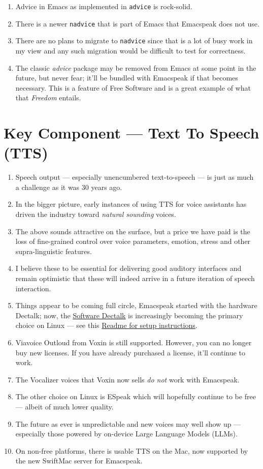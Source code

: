 \documentclass[11pt]{article}
\begin{document}
\begin{enumerate}
\item Advice in Emacs as implemented in \texttt{advice} is rock-solid.
\item There is a newer \texttt{nadvice} that is part of Emacs that Emacspeak
does not use.

\item There are no plans to migrate to \texttt{nadvice} since that is a lot of
busy work in my view and any such migration would be difficult
to test for correctness.
\item The classic \emph{advice} package may be removed from Emacs at some
point in the future, but never fear; it'll be bundled with
Emacspeak if that becomes necessary. This is a feature of Free Software and is a great
example of what that \emph{Freedom} entails.
\end{enumerate}
\section{Key Component —  Text To Speech (TTS)}
\label{sec:orgc35da78}

\begin{enumerate}
\item Speech output --- especially unencumbered text-to-speech --- is just
as much a challenge as it was 30 years ago.
\item In the bigger picture, early instances of using TTS for voice
assistants has driven the industry toward \emph{natural sounding} voices.
\item The above sounds attractive on the surface, but a price we have
paid is the  loss of fine-grained control over voice parameters,
emotion, stress and other supra-linguistic features.
\item I  believe  these to be essential for delivering
good auditory interfaces and   remain optimistic that
these will indeed arrive in a future iteration of speech
interaction.
\item Things appear to be coming full circle, Emacspeak started with
the hardware Dectalk; now, the \href{https://github.com/dectalk/dectalk.git}{Software Dectalk} is increasingly
becoming the primary choice on Linux --- see this  \href{https://raw.githubusercontent.com/tvraman/emacspeak/master/servers/software-dtk/Readme.org}{Readme for setup instructions}.
\item Viavoice Outloud from Voxin is still supported.  However,
you can no longer buy new licenses. If you have already purchased
a license, it'll
continue to work.
\item The  Vocalizer voices that Voxin now sells \emph{do not} work with Emacspeak.
\item The  other choice on Linux is ESpeak which will hopefully
continue to be free --- albeit of much lower quality.
\item The future as ever is unpredictable and new voices may well show
up --- especially those powered by on-device Large Language
Models (LLMs).

\item On non-free platforms, there is usable TTS on the Mac, now
supported by the new SwiftMac server for Emacspeak.
\end{enumerate}
\end{document}
